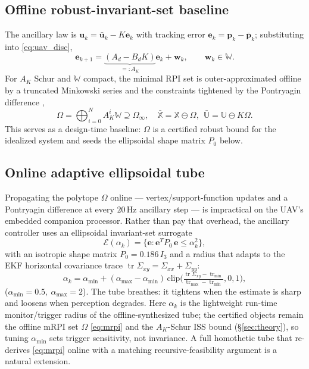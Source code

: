 \documentclass[letterpaper, 10 pt, conference]{ieeeconf}  %
\DeclareMathOperator{\tr}{tr}
\begin{document}
\subsection{Offline robust-invariant-set baseline}
\label{sec:mrpi}
The ancillary law is $\mathbf{u}_k=\bar{\mathbf{u}}_k-K\mathbf{e}_k$ with tracking
error $\mathbf{e}_k=\mathbf{p}_k-\bar{\mathbf{p}}_k$; substituting into
\eqref{eq:uav_disc},
\begin{equation}
\mathbf{e}_{k+1}=\underbrace{(A_d-B_dK)}_{=:A_K}\mathbf{e}_k+\mathbf{w}_k,
\qquad \mathbf{w}_k\in\mathbb{W}.
\label{eq:error_dynamics}
\end{equation}
For $A_K$ Schur and $\mathbb{W}$ compact, the minimal RPI set is outer-approximated {offline}
by a truncated Minkowski series and the constraints tightened by the Pontryagin difference
\cite{mRPI},
\begin{equation}
\Omega=\textstyle\bigoplus_{i=0}^{N}A_K^i\mathbb{W}\supseteq\Omega_\infty,\quad
\bar{\mathbb{X}}=\mathbb{X}\ominus\Omega,\ \ \bar{\mathbb{U}}=\mathbb{U}\ominus K\Omega .
\label{eq:mrpi}
\end{equation}
This serves as a {design-time baseline}: $\Omega$ is a certified robust bound for the
idealized system and seeds the ellipsoidal shape matrix $P_0$ below.

\subsection{Online adaptive ellipsoidal tube}
Propagating the polytope $\Omega$ online --- vertex/support-function updates and a
Pontryagin difference at every $20$\,Hz ancillary step --- is impractical on the UAV's
embedded companion processor. Rather than pay that overhead, the ancillary controller uses
an {ellipsoidal} invariant-set surrogate
\begin{equation}
\mathcal{E}(\alpha_k)=\{\mathbf{e}: \mathbf{e}^T P_0\,\mathbf{e}\le\alpha_k^2\},
\label{eq:ellipsoid}
\end{equation}
with an isotropic shape matrix $P_0=0.186\,I_3$ and a radius that adapts to the EKF horizontal
covariance trace
$\tr\Sigma_{xy}=\Sigma_{xx}+\Sigma_{yy}$:
\begin{equation}
\alpha_k=\alpha_{\min}+(\alpha_{\max}-\alpha_{\min})\,
\mathrm{clip}\!\Big(\tfrac{\tr\Sigma_{xy}-\tr_{\min}}{\tr_{\max}-\tr_{\min}},0,1\Big),
\label{eq:alpha}
\end{equation}
($\alpha_{\min}=0.5,\ \alpha_{\max}=2$). The tube {breathes}: it tightens when the estimate
is sharp and loosens when perception degrades. Here $\alpha_k$ is the lightweight run-time
monitor/trigger radius of the offline-synthesized tube; the certified objects remain the offline
mRPI set $\Omega$ \eqref{eq:mrpi} and the $A_K$-Schur ISS bound (\S\ref{sec:theory}), so tuning
$\alpha_{\min}$ sets trigger sensitivity, not invariance. A full homothetic tube that re-derives
\eqref{eq:mrpi} online with a matching recursive-feasibility argument is a natural extension.
\end{document}
